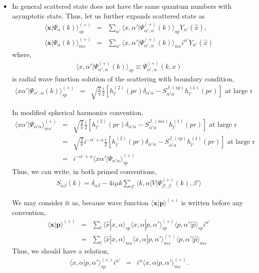 \documentclass[10pt]{book}
\def\bm{\boldsymbol}
\newcommand{\bea}{\begin{eqnarray}}
\newcommand{\eea}{\end{eqnarray}}
\newcommand{\no}{\nonumber \\}
\def\vp{{\bm p}}
\def\vx{{\bm x}}
\def\la{\langle}
\def\ra{\rangle}
\begin{document}
\begin{itemize}
\item In general scattered state does not have the same
quantum numbers with asymptotic state.
Thus, let us further expands scattered state as
\bea
\la \vx |\Psi_\alpha(k)\ra^{(+)}_{sp}
&=&\sum_{\alpha'} 
\la x,\alpha'|\Psi^{(+)}_{\alpha',\alpha}(k)\ra_{sp}
Y_{\alpha'}(\hat{x}),\no
\la \vx |\Psi_\alpha(k)\ra^{(+)}_{ms}
&=&\sum_{\alpha'} 
\la x,\alpha'|\Psi^{(+)}_{\alpha',\alpha}(k)\ra_{ms}
i^{\alpha'}Y_{\alpha'}(\hat{x})
\eea
where,
\bea
\la x,\alpha'|\Psi^{(+)}_{\alpha',\alpha}(k)\ra_{sp}
\equiv \Psi^{(+)}_{\alpha',\alpha}(k,x)
\eea
is radial wave function solution 
of the scattering with 
boundary condition,
\bea
\la x \alpha'|\Psi_{\alpha',\alpha}(k)\ra^{(+)}_{sp}
&=&\sqrt{\frac{2}{\pi}}\frac{i}{2}
                  [h^{(2)}_{l'}(pr)\delta_{\alpha'\alpha}
                      -S^{J,(sp)}_{\alpha'\alpha} 
                      h^{(1)}_{l'}(pr)] 
                      \mbox{ at large r}
\eea

In modified spherical harmonics convention,
\bea
\la x \alpha'|\Psi_{\alpha'\alpha}\ra^{(+)}_{ms}
&=&\sqrt{\frac{2}{\pi}}
    \frac{i}{2}[h^{(2)}_{l'}(pr)\delta_{\alpha'\alpha}
                      -S^{J,(ms)}_{\alpha'\alpha} 
                      h^{(1)}_{l'}(pr)] 
                      \mbox{ at large r}\no
&=&\sqrt{\frac{2}{\pi}}
   i^{-\alpha'+\alpha} \frac{i}{2}
                  [h^{(2)}_{l'}(pr)\delta_{\alpha'\alpha}
                      -S^{J,(sp)}_{\alpha'\alpha} 
                      h^{(1)}_{l'}(pr)] 
                      \mbox{ at large r}\no
&=&i^{-\alpha'+\alpha}\la x \alpha'|\Psi_{\alpha'\alpha}\ra^{(+)}_{sp}
\eea
Thus, we can write, in both primed conventions,
\bea
S_{\alpha\beta}(k)=\delta_{\alpha\beta}-4i\mu k
 \sum_{\beta'}\la k, \alpha|V|\Psi^{(+)}_{\beta',\beta}(k),\beta'\ra
\eea

We may consider it as, because wave function 
$\la\vx|\vp\ra^{(+)}$ is written before any convention,
\bea
\la \vx|\vp\ra^{(+)}&=&\sum_{l}\la \hat{x}|x,\alpha\ra_{sp}
                     \la x,\alpha|p,\alpha'\ra^{(+)}_{sp}
                     \la p,\alpha'|\hat{p}\ra_{sp} i^{\alpha'}\no
                    &=&\sum_{l}\la \hat{x}|x,\alpha\ra_{ms}
                     \la x,\alpha|p,\alpha'\ra^{(+)}_{ms}
                     \la p,\alpha'|\hat{p}\ra_{ms}  
\eea
Thus, we should have a relation,
\bea
\la x,\alpha|p,\alpha'\ra^{(+)}_{sp}i^{\alpha'}
&=& i^{\alpha}\la x,\alpha|p,\alpha'\ra^{(+)}_{ms}.
\eea


\end{itemize}
\end{document}
